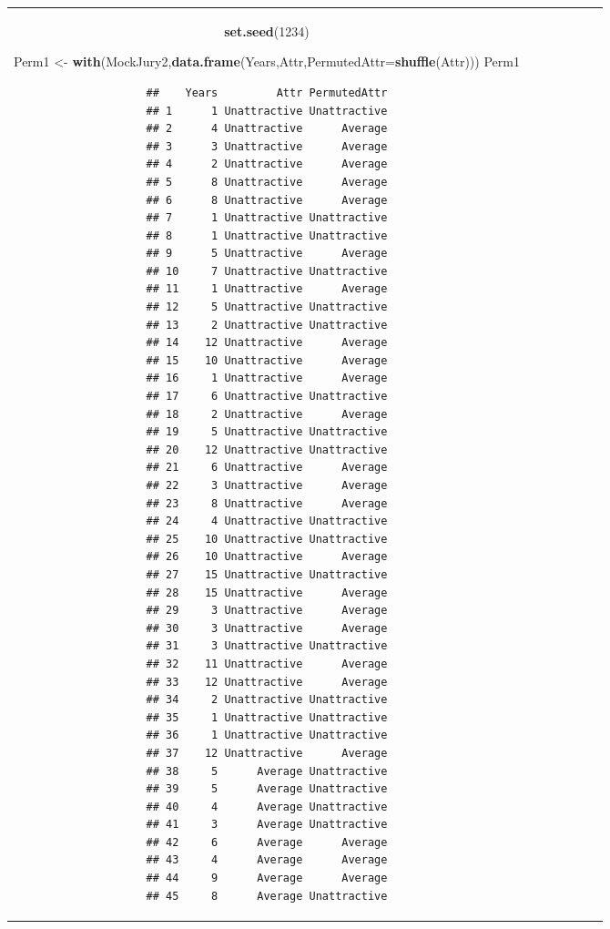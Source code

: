 \documentclass[]{book}
\newenvironment{Shaded}{\begin{snugshade}}{\end{snugshade}}
\newcommand{\KeywordTok}[1]{\textcolor[rgb]{0.13,0.29,0.53}{\textbf{#1}}}
\newcommand{\DataTypeTok}[1]{\textcolor[rgb]{0.13,0.29,0.53}{#1}}
\newcommand{\DecValTok}[1]{\textcolor[rgb]{0.00,0.00,0.81}{#1}}
\newcommand{\StringTok}[1]{\textcolor[rgb]{0.31,0.60,0.02}{#1}}
\newcommand{\NormalTok}[1]{#1}
\theoremstyle{definition}
\theoremstyle{definition}
\theoremstyle{remark}
\begin{document}
\begin{longtable}[]{@{}ccccccc@{}}
\begin{minipage}[b]{0.10\columnwidth}
\begin{Shaded}
\begin{Highlighting}[]
\KeywordTok{set.seed}\NormalTok{(}\DecValTok{1234}\NormalTok{)}
\end{Highlighting}
\end{Shaded}

\begin{Shaded}
\begin{Highlighting}[]
\NormalTok{Perm1 <-}\StringTok{ }\KeywordTok{with}\NormalTok{(MockJury2,}\KeywordTok{data.frame}\NormalTok{(Years,Attr,}\DataTypeTok{PermutedAttr=}\KeywordTok{shuffle}\NormalTok{(Attr)))}
\NormalTok{Perm1}
\end{Highlighting}
\end{Shaded}

\begin{verbatim}
##    Years         Attr PermutedAttr
## 1      1 Unattractive Unattractive
## 2      4 Unattractive      Average
## 3      3 Unattractive      Average
## 4      2 Unattractive      Average
## 5      8 Unattractive      Average
## 6      8 Unattractive      Average
## 7      1 Unattractive Unattractive
## 8      1 Unattractive Unattractive
## 9      5 Unattractive      Average
## 10     7 Unattractive Unattractive
## 11     1 Unattractive      Average
## 12     5 Unattractive Unattractive
## 13     2 Unattractive Unattractive
## 14    12 Unattractive      Average
## 15    10 Unattractive      Average
## 16     1 Unattractive      Average
## 17     6 Unattractive Unattractive
## 18     2 Unattractive      Average
## 19     5 Unattractive Unattractive
## 20    12 Unattractive Unattractive
## 21     6 Unattractive      Average
## 22     3 Unattractive      Average
## 23     8 Unattractive      Average
## 24     4 Unattractive Unattractive
## 25    10 Unattractive Unattractive
## 26    10 Unattractive      Average
## 27    15 Unattractive Unattractive
## 28    15 Unattractive      Average
## 29     3 Unattractive      Average
## 30     3 Unattractive      Average
## 31     3 Unattractive Unattractive
## 32    11 Unattractive      Average
## 33    12 Unattractive      Average
## 34     2 Unattractive Unattractive
## 35     1 Unattractive Unattractive
## 36     1 Unattractive Unattractive
## 37    12 Unattractive      Average
## 38     5      Average Unattractive
## 39     5      Average Unattractive
## 40     4      Average Unattractive
## 41     3      Average Unattractive
## 42     6      Average      Average
## 43     4      Average      Average
## 44     9      Average      Average
## 45     8      Average Unattractive

\end{verbatim}
\end{minipage}
\end{longtable}
\end{document}
